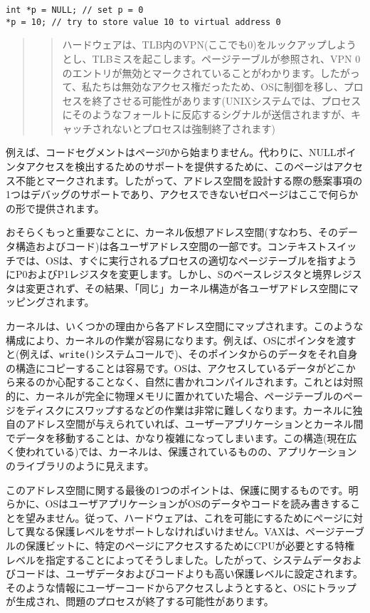 \begin{verbatim}
int *p = NULL; // set p = 0
*p = 10; // try to store value 10 to virtual address 0
\end{verbatim}

\begin{quote}
\begin{quote}
ハードウェアは、TLB内のVPN(ここでも0)をルックアップしようとし、TLBミスを起こします。ページテーブルが参照され、VPN
0のエントリが無効とマークされていることがわかります。したがって、私たちは無効なアクセス権だったため、OSに制御を移し、プロセスを終了させる可能性があります(UNIXシステムでは、プロセスにそのようなフォールトに反応するシグナルが送信されますが、キャッチされないとプロセスは強制終了されます)
\end{quote}
\end{quote}

例えば、コードセグメントはページ0から始まりません。代わりに、NULLポインタアクセスを検出するためのサポートを提供するために、このページはアクセス不能とマークされます。したがって、アドレス空間を設計する際の懸案事項の1つはデバッグのサポートであり、アクセスできないゼロページはここで何らかの形で提供されます。

おそらくもっと重要なことに、カーネル仮想アドレス空間(すなわち、そのデータ構造およびコード)は各ユーザアドレス空間の一部です。コンテキストスイッチでは、OSは、すぐに実行されるプロセスの適切なページテーブルを指すようにP0およびP1レジスタを変更します。しかし、Sのベースレジスタと境界レジスタは変更されず、その結果、「同じ」カーネル構造が各ユーザアドレス空間にマッピングされます。

カーネルは、いくつかの理由から各アドレス空間にマップされます。このような構成により、カーネルの作業が容易になります。例えば、OSにポインタを渡すと(例えば、\texttt{write()}システムコールで)、そのポインタからのデータをそれ自身の構造にコピーすることは容易です。OSは、アクセスしているデータがどこから来るのか心配することなく、自然に書かれコンパイルされます。これとは対照的に、カーネルが完全に物理メモリに置かれていた場合、ページテーブルのページをディスクにスワップするなどの作業は非常に難しくなります。カーネルに独自のアドレス空間が与えられていれば、ユーザーアプリケーションとカーネル間でデータを移動することは、かなり複雑になってしまいます。この構造(現在広く使われている)では、カーネルは、保護されているものの、アプリケーションのライブラリのように見えます。

このアドレス空間に関する最後の1つのポイントは、保護に関するものです。明らかに、OSはユーザアプリケーションがOSのデータやコードを読み書きすることを望みません。従って、ハードウェアは、これを可能にするためにページに対して異なる保護レベルをサポートしなければいけません。VAXは、ページテーブルの保護ビットに、特定のページにアクセスするためにCPUが必要とする特権レベルを指定することによってそうしました。したがって、システムデータおよびコードは、ユーザデータおよびコードよりも高い保護レベルに設定されます。そのような情報にユーザーコードからアクセスしようとすると、OSにトラップが生成され、問題のプロセスが終了する可能性があります。

